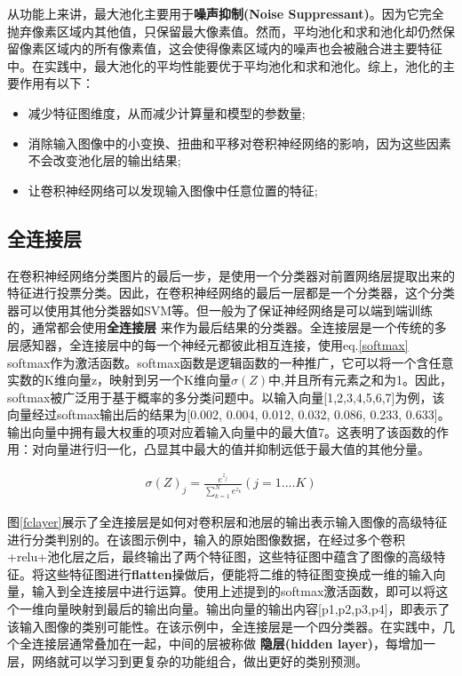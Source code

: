 从功能上来讲，最大池化主要用于\textbf{噪声抑制(Noise Suppressant)}。因为它完全抛弃像素区域内其他值，只保留最大像素值。然而，平均池化和求和池化却仍然保留像素区域内的所有像素值，这会使得像素区域内的噪声也会被融合进主要特征中。在实践中，最大池化的平均性能要优于平均池化和求和池化。综上，池化的主要作用有以下：

\begin{itemize}
	\item 减少特征图维度，从而减少计算量和模型的参数量;
	\item 消除输入图像中的小变换、扭曲和平移对卷积神经网络的影响，因为这些因素不会改变池化层的输出结果;
	\item 让卷积神经网络可以发现输入图像中任意位置的特征;
\end{itemize}

\subsection{全连接层}
在卷积神经网络分类图片的最后一步，是使用一个分类器对前置网络层提取出来的特征进行投票分类。因此，在卷积神经网络的最后一层都是一个分类器，这个分类器可以使用其他分类器如SVM等。但一般为了保证神经网络是可以端到端训练的，通常都会使用\textbf{全连接层} 来作为最后结果的分类器。全连接层是一个传统的多层感知器，全连接层中的每一个神经元都彼此相互连接，使用eq.\ref{softmax} softmax作为激活函数。softmax函数是逻辑函数的一种推广，它可以将一个含任意实数的K维向量z，映射到另一个K维向量$\sigma (Z)$中,并且所有元素之和为1。因此，softmax被广泛用于基于概率的多分类问题中。以输入向量[1,2,3,4,5,6,7]为例，该向量经过softmax输出后的结果为[0.002, 0.004, 0.012, 0.032, 0.086, 0.233, 0.633]。输出向量中拥有最大权重的项对应着输入向量中的最大值7。这表明了该函数的作用：对向量进行归一化，凸显其中最大的值并抑制远低于最大值的其他分量。

\begin{equation}
\begin{aligned}
\label{softmax}
\sigma (Z)_j = \frac{e^{z_j}}{\sum_{k=1}^N e^{z_k}}  (j=1....K)
\end{aligned}
\end{equation}

图\ref{fclayer}展示了全连接层是如何对卷积层和池层的输出表示输入图像的高级特征进行分类判别的。在该图示例中，输入的原始图像数据，在经过多个卷积+relu+池化层之后，最终输出了两个特征图，这些特征图中蕴含了图像的高级特征。将这些特征图进行\textbf{flatten}操做后，便能将二维的特征图变换成一维的输入向量，输入到全连接层中进行运算。使用上述提到的softmax激活函数，即可以将这个一维向量映射到最后的输出向量。输出向量的输出内容[p1,p2,p3,p4]，即表示了该输入图像的类别可能性。在该示例中，全连接层是一个四分类器。在实践中，几个全连接层通常叠加在一起，中间的层被称做 \textbf{隐层(hidden layer)}，每增加一层，网络就可以学习到更复杂的功能组合，做出更好的类别预测。

